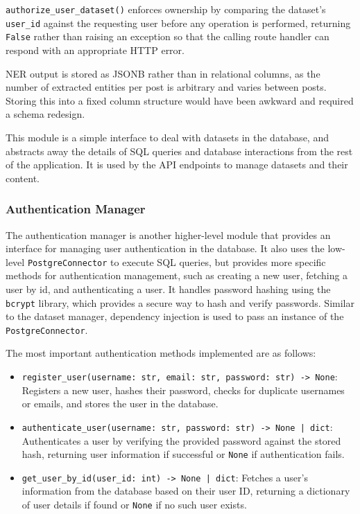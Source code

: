 \documentclass[12pt, a4paper]{article}
\begin{document}
\texttt{authorize\_user\_dataset()} enforces ownership by comparing the dataset's \texttt{user\_id} against the requesting user before any operation is performed, returning \texttt{False} rather than raising an exception so that the calling route handler can respond with an appropriate HTTP error.

NER output is stored as JSONB rather than in relational columns, as the number of extracted entities per post is arbitrary and varies between posts. Storing this into a fixed column structure would have been awkward and required a schema redesign.

This module is a simple interface to deal with datasets in the database, and abstracts away the details of SQL queries and database interactions from the rest of the application. It is used by the API endpoints to manage datasets and their content.

\subsubsection{Authentication Manager}
\label{sec:auth-manager}
The authentication manager is another higher-level module that provides an interface for managing user authentication in the database. It also uses the low-level \texttt{PostgreConnector} to execute SQL queries, but provides more specific methods for authentication management, such as creating a new user, fetching a user by id, and authenticating a user. It handles password hashing using the \texttt{bcrypt} library, which provides a secure way to hash and verify passwords. Similar to the dataset manager, dependency injection is used to pass an instance of the \texttt{PostgreConnector}.

The most important authentication methods implemented are as follows:
\begin{itemize}
    \item \texttt{register\_user(username: str, email: str, password: str) -> None}: Registers a new user, hashes their password, checks for duplicate usernames or emails, and stores the user in the database.
    \item \texttt{authenticate\_user(username: str, password: str) -> None | dict}: Authenticates a user by verifying the provided password against the stored hash, returning user information if successful or \texttt{None} if authentication fails.
    \item \texttt{get\_user\_by\_id(user\_id: int) -> None | dict}: Fetches a user's information from the database based on their user ID, returning a dictionary of user details if found or \texttt{None} if no such user exists.
\end{itemize}
\end{document}
